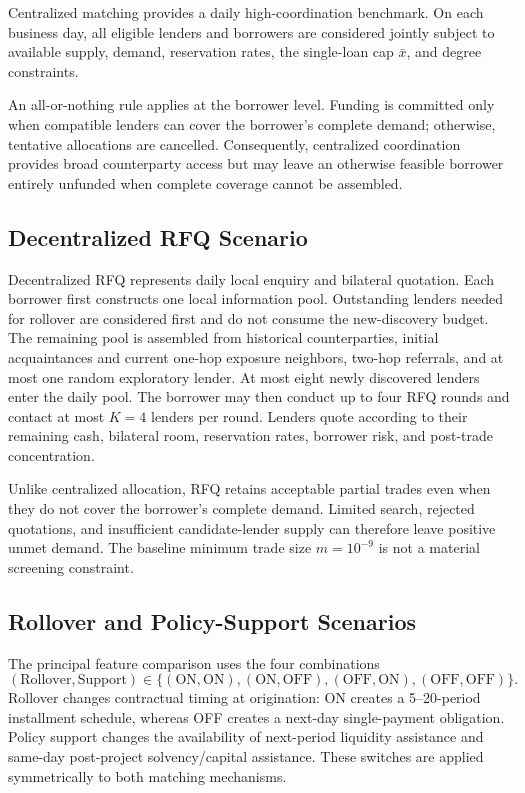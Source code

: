 Centralized matching provides a daily high-coordination benchmark. On
each business day, all eligible lenders and borrowers are considered
jointly subject to available supply, demand, reservation rates, the
single-loan cap \(\bar{x}\), and degree constraints.

An all-or-nothing rule applies at the borrower level. Funding is
committed only when compatible lenders can cover the borrower's complete
demand; otherwise, tentative allocations are cancelled. Consequently,
centralized coordination provides broad counterparty access but may leave
an otherwise feasible borrower entirely unfunded when complete coverage
cannot be assembled.

\subsection{Decentralized RFQ Scenario}

Decentralized RFQ represents daily local enquiry and bilateral quotation.
Each borrower first constructs one local information pool. Outstanding
lenders needed for rollover are considered first and do not consume the
new-discovery budget. The remaining pool is assembled from historical
counterparties, initial acquaintances and current one-hop exposure
neighbors, two-hop referrals, and at most one random exploratory lender.
At most eight newly discovered lenders enter the daily pool. The borrower
may then conduct up to four RFQ rounds and contact at most \(K=4\) lenders
per round. Lenders quote according to their remaining cash, bilateral
room, reservation rates, borrower risk, and post-trade concentration.

Unlike centralized allocation, RFQ retains acceptable partial trades even
when they do not cover the borrower's complete demand. Limited search,
rejected quotations, and insufficient candidate-lender supply can
therefore leave positive unmet demand. The baseline minimum trade size
\(m=10^{-9}\) is not a material screening constraint.

\subsection{Rollover and Policy-Support Scenarios}

The principal feature comparison uses the four combinations
\begin{equation}
(\mathrm{Rollover},\mathrm{Support})
\in
\{(\mathrm{ON},\mathrm{ON}),
(\mathrm{ON},\mathrm{OFF}),
(\mathrm{OFF},\mathrm{ON}),
(\mathrm{OFF},\mathrm{OFF})\}.
\end{equation}
Rollover changes contractual timing at origination: ON creates a
5--20-period installment schedule, whereas OFF creates a next-day
single-payment obligation.
Policy support changes the availability of next-period liquidity
assistance and same-day post-project solvency/capital assistance. These
switches are applied symmetrically to both matching mechanisms.

